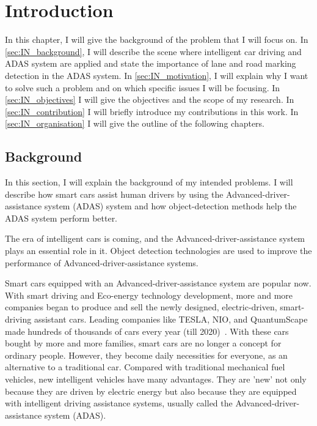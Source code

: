 
\chapter{Introduction}
\begin{spacing}{1.5}
\setlength{\parskip}{0.3in}

In this chapter, I will give the background of the problem that I will focus on. In \autoref{sec:IN_background}, I will describe the scene where intelligent car driving and ADAS system are applied and state the importance of lane and road marking detection in the ADAS system. In \autoref{sec:IN_motivation}, I will explain why I want to solve such a problem and on which specific issues I will be focusing. In \autoref{sec:IN_objectives} I will give the objectives and the scope of my research. In \autoref{sec:IN_contribution} I will briefly introduce my contributions in this work. In \autoref{sec:IN_organisation} I will give the outline of the following chapters.

\section{Background}
\label{sec:IN_background}

In this section, I will explain the background of my intended problems. I will describe how smart cars assist human drivers by using the Advanced-driver-assistance system (ADAS) system and how object-detection methods help the ADAS system perform better.

The era of intelligent cars is coming, and the Advanced-driver-assistance system plays an essential role in it. Object detection technologies are used to improve the performance of Advanced-driver-assistance systems.

Smart cars equipped with an Advanced-driver-assistance system are popular now. With smart driving and Eco-energy technology development, more and more companies began to produce and sell the newly designed, electric-driven, smart-driving assistant cars. Leading companies like TESLA, NIO, and QuantumScape made hundreds of thousands of cars every year (till 2020)~\cite{petranek2015we}. With these cars bought by more and more families, smart cars are no longer a concept for ordinary people. However, they become daily necessities for everyone, as an alternative to a traditional car. Compared with traditional mechanical fuel vehicles, new intelligent vehicles have many advantages. They are 'new' not only because they are driven by electric energy but also because they are equipped with intelligent driving assistance systems, usually called the Advanced-driver-assistance system (ADAS).



\end{spacing}
